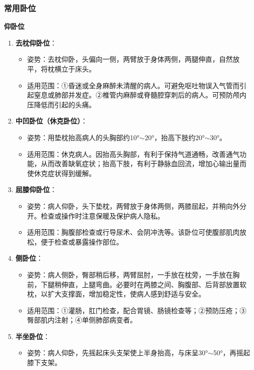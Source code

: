 \documentclass[11pt, a4paper]{ctexart}
\begin{document}
\subsubsection{常用卧位}
\textbf{仰卧位}
\begin{enumerate}
	\item \textbf{去枕仰卧位}：
	      \begin{itemize}
		      \item 姿势：去枕仰卧，头偏向一侧，两臂放于身体两侧，两腿伸直，自然放平，将枕横立于床头。
		      \item 适用范围：①昏迷或全身麻醉未清醒的病人。可避免呕吐物误入气管而引起窒息或肺部并发症。②椎管内麻醉或脊髓腔穿刺后的病人。可预防颅内压降低而引起的头痛。
	      \end{itemize}
	\item \textbf{中凹卧位（休克卧位）}：
	      \begin{itemize}
		      \item 姿势：用垫枕抬高病人的头胸部约10°$\sim$20°，抬高下肢约20°$\sim$30°。
		      \item 适用范围：休克病人。因抬高头胸部，有利于保持气道通畅，改善通气功能，从而改善缺氧症状；抬高下肢，有利于静脉血回流，增加心输出量而使休克症状得到缓解。
	      \end{itemize}
	\item \textbf{屈膝仰卧位}：
	      \begin{itemize}
		      \item 姿势：病人仰卧，头下垫枕，两臂放于身体两侧，两膝屈起，并稍向外分开。检查或操作时注意保暖及保护病人隐私。
		      \item 适用范围：胸腹部检查或行导尿术、会阴冲洗等。该卧位可使腹部肌肉放松，便于检查或暴露操作部位。
	      \end{itemize}
	\item \textbf{侧卧位}：
	      \begin{itemize}
		      \item 姿势：病人侧卧，臀部稍后移，两臂屈肘，一手放在枕旁，一手放在胸前，下腿稍伸直，上腿弯曲。必要时在两膝之间、胸腹部、后背部放置软枕，以扩大支撑面，增加稳定性，使病人感到舒适与安全。
		      \item 适用范围：①灌肠，肛门检查，配合胃镜、肠镜检查等；②预防压疮；③臀部肌内注射；④单侧肺部病变者。
	      \end{itemize}
	\item \textbf{半坐卧位}：
	      \begin{itemize}
		      \item 姿势：病人仰卧，先摇起床头支架使上半身抬高，与床呈30°$\sim$50°，再摇起膝下支架。

\end{itemize}
\end{enumerate}
\end{document}
